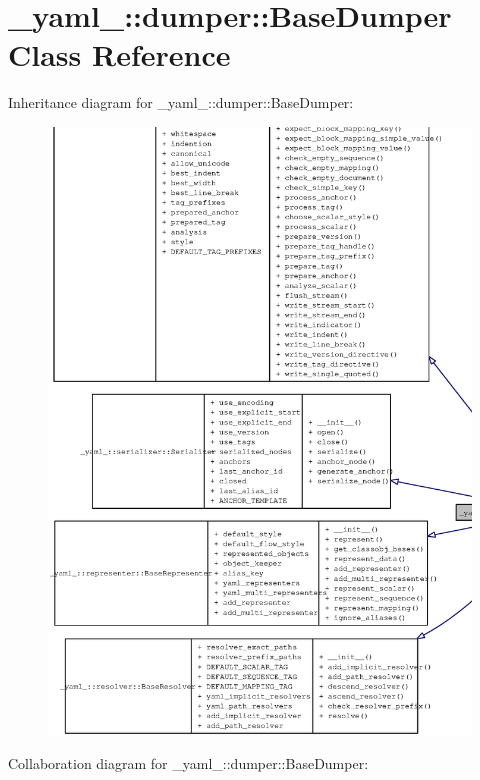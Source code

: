 \section{\_\-yaml\_\-::dumper::BaseDumper Class Reference}
\label{class__yaml___1_1dumper_1_1BaseDumper}
Inheritance diagram for \_\-yaml\_\-::dumper::BaseDumper:\nopagebreak
\begin{figure}[H]
\begin{center}
\leavevmode
\includegraphics[width=400pt]{class__yaml___1_1dumper_1_1BaseDumper__inherit__graph}
\end{center}
\end{figure}
Collaboration diagram for \_\-yaml\_\-::dumper::BaseDumper:\nopagebreak
